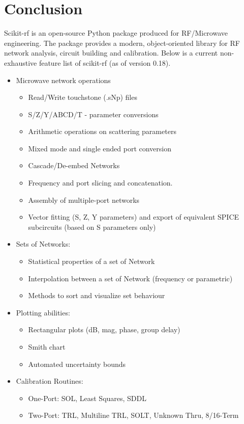 \documentclass{IEEEjmw}
\begin{document}
\section{Conclusion}
Scikit-rf is an open-source Python package produced for RF/Microwave engineering. The package provides a modern, object-oriented library for RF network analysis, circuit building and calibration. Below is a current non-exhaustive feature list of scikit-rf (as of version 0.18).

\begin{itemize}
	\item	Microwave network operations
	\begin{itemize}
	\item	Read/Write touchstone (.sNp) files
	\item	S/Z/Y/ABCD/T - parameter conversions
	\item	Arithmetic operations on scattering parameters
	\item   Mixed mode and single ended port conversion
	\item	Cascade/De-embed Networks
	\item	Frequency and port slicing and concatenation.
	\item   Assembly of multiple-port networks
	\item    Vector fitting (S, Z, Y parameters) and export of equivalent SPICE subcircuits (based on S parameters only)
	\end{itemize}
\item	Sets of Networks:
	\begin{itemize}
		\item Statistical properties of a set of Network
		\item Interpolation between a set of Network (frequency or parametric)
		\item Methods to sort and visualize set behaviour
	\end{itemize}
\item	Plotting abilities:
	\begin{itemize}
		\item Rectangular plots (dB, mag, phase, group delay)
		\item Smith chart
		\item Automated uncertainty bounds
	\end{itemize}
\item	Calibration Routines:
	\begin{itemize}
		\item One-Port: SOL, Least Squares, SDDL
		\item Two-Port: TRL, Multiline TRL, SOLT, Unknown Thru, 8/16-Term

\end{itemize}
\end{itemize}
\end{document}

